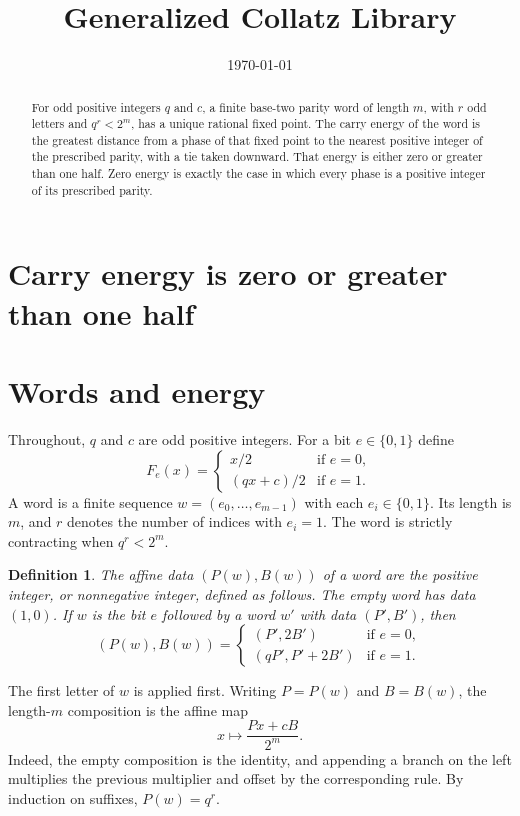\documentclass[11pt,letterpaper]{article}
\title{Generalized Collatz Library}
\author{}
\date{\today}
\newtheorem{definition}[theorem]{Definition}
\begin{document}
\maketitle
\section*{Carry energy is zero or greater than one half}

\begin{abstract}
For odd positive integers \(q\) and \(c\), a finite base-two parity word of length \(m\), with \(r\) odd letters and
\(q^r<2^m\), has a unique rational fixed point. The carry energy of the word is the greatest distance from a phase of that fixed point to the nearest positive integer of the prescribed parity, with a tie taken downward. That energy is either zero or greater than one half. Zero energy is exactly the case in which every phase is a positive integer of its prescribed parity.
\end{abstract}

\section{Words and energy}

Throughout, \(q\) and \(c\) are odd positive integers. For a bit \(e\in\{0,1\}\) define
\[
F_e(x)=
\begin{cases}
x/2 & \text{if }e=0,\\
(qx+c)/2 & \text{if }e=1.
\end{cases}
\]
A word is a finite sequence \(w=(e_0,\ldots,e_{m-1})\) with each \(e_i\in\{0,1\}\). Its length is \(m\), and \(r\) denotes the number of indices with \(e_i=1\). The word is strictly contracting when \(q^r<2^m\).

\begin{definition}
The affine data \((P(w),B(w))\) of a word are the positive integer, or nonnegative integer, defined as follows. The empty word has data \((1,0)\). If \(w\) is the bit \(e\) followed by a word \(w'\) with data \((P',B')\), then
\[
(P(w),B(w))=
\begin{cases}
(P',2B') & \text{if }e=0,\\
(qP',P'+2B') & \text{if }e=1.
\end{cases}
\]
\end{definition}

The first letter of \(w\) is applied first. Writing \(P=P(w)\) and \(B=B(w)\), the length-\(m\) composition is the affine map
\[
x\longmapsto \frac{Px+cB}{2^m}.
\]
Indeed, the empty composition is the identity, and appending a branch on the left multiplies the previous multiplier and offset by the corresponding rule. By induction on suffixes, \(P(w)=q^r\).
\end{document}
